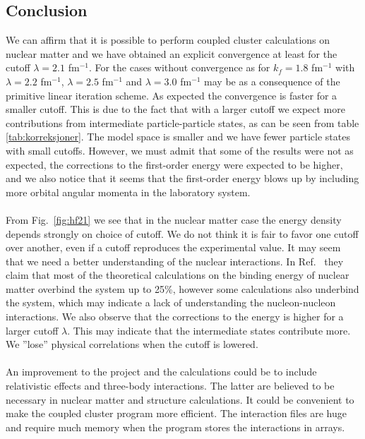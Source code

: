 \subsection{Conclusion}

We can affirm that it is possible to perform coupled cluster calculations on 
nuclear matter and we have obtained an explicit convergence at least for the cutoff 
$\lambda=2.1$ fm$^{-1}$. For the cases without convergence as for 
$k_f=1.8$ fm$^{-1}$ with $\lambda=2.2$ fm$^{-1}$, $\lambda=2.5$ fm$^{-1}$ and 
$\lambda=3.0$ fm$^{-1}$ may be as a consequence of the primitive linear iteration scheme.  
As expected the convergence is faster for a smaller cutoff. This is due to the fact that
with a larger cutoff we expect more contributions from intermediate particle-particle states, as
can be seen from table \ref{tab:korreksjoner}. The model space is smaller and we have fewer particle states with small cutoffs.
However, we must admit that some of the results were not as expected, the corrections to the
first-order energy were expected to be higher, and we also notice that it seems
that the first-order energy blows up by including more orbital angular
momenta in the laboratory system. \\
\\
From Fig.~\ref{fig:hf21} we see that in the nuclear matter case the energy density depends 
strongly 
on choice of cutoff. We do not think it is fair to favor one cutoff over another, even if a cutoff reproduces the experimental value. %
It may seem 
that we need a better understanding of the nuclear interactions. In Ref.~\cite{inmedium} they claim that most of the theoretical calculations on the binding energy of nuclear
matter  overbind the system up to 25\%, however some calculations also underbind
the system, which may indicate a lack of understanding the nucleon-nucleon interactions.
We also observe that the corrections to the energy is higher for a larger cutoff
$\lambda$. This may indicate that the intermediate states contribute more. 
We ''lose'' physical correlations when the cutoff is lowered.\\ 
\\
An improvement to the project and the
calculations could be to include relativistic effects and three-body interactions. The latter 
are believed to be necessary in nuclear matter and structure calculations. It could be 
convenient to make the coupled cluster program more efficient. The interaction 
files are huge and require much memory when the program stores the interactions
in arrays.   

